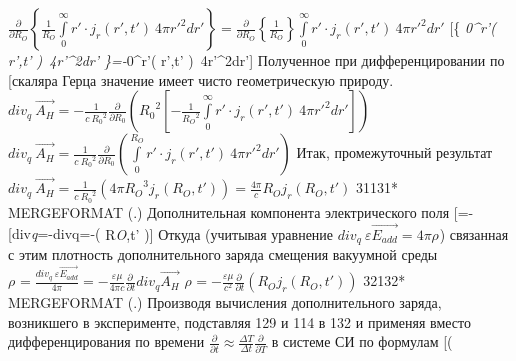 \documentclass[11pt]{article}
\begin{document}
\(\frac{\partial }{\partial {{R}_{O}}}\left\{ \frac{1}{{{R}_{O}}}\int\limits_{0}^{\infty }{r'\cdot {{j}_{r}}\left( r',t' \right)}\ 4\pi r{{'}^{2}}dr' \right\}=\frac{\partial }{\partial {{R}_{O}}}\left\{ \frac{1}{{{R}_{O}}} \right\}\int\limits_{0}^{\infty }{r'\cdot {{j}_{r}}\left( r',t' \right)}\ 4\pi r{{'}^{2}}dr'\)
{[}\left\{
\int\limits\emph{{0}^{\infty }{r'\left(
r',t' \right)}~4\pi r{{'}^{2}}dr'
\right\}=-\int\limits}{0}^{\infty }{r'\left(
r',t' \right)}~4\pi r{{'}^{2}}dr'{]} Полученное при
дифференцировании по {[}\frac{\partial }{\partial {{R}_{O}}}{]}скаляра
Герца значение имеет чисто геометрическую природу.
\(di{{v}_{q}}\ \overrightarrow{{{A}_{H}}}=-\frac{1}{c\ {{R}_{0}}^{2}}\frac{\partial }{\partial {{R}_{0}}}\left( {{R}_{0}}^{2}\left[ -\frac{1}{{{R}_{O}}^{2}}\int\limits_{0}^{\infty }{r'\cdot {{j}_{r}}\left( r',t' \right)}\ 4\pi r{{'}^{2}}dr' \right] \right)\)
\(di{{v}_{q}}\ \overrightarrow{{{A}_{H}}}=\frac{1}{c\ {{R}_{0}}^{2}}\frac{\partial }{\partial {{R}_{0}}}\left( \int\limits_{0}^{{{R}_{O}}}{r'\cdot {{j}_{r}}\left( r',t' \right)}\ 4\pi r{{'}^{2}}dr' \right)\)
Итак, промежуточный результат
\(di{{v}_{q}}\ \overrightarrow{{{A}_{H}}}=\frac{1}{c\ {{R}_{0}}^{2}}\left( 4\pi {{R}_{O}}^{3}{{j}_{r}}\left( {{R}_{O}},t' \right) \right)=\frac{4\pi }{c}{{R}_{O}}{{j}_{r}}\left( {{R}_{O}},t' \right)\)
31131* MERGEFORMAT (.) Дополнительная компонента электрического поля
{[}=-\frac{\partial \overrightarrow{{{A}_{H}}}}{\partial t}{]}
{[}di{{v}\emph{{q}}=-di{{v}}{q}}=-\left(
{{R}\emph{{O}},t' \right){]} Откуда (учитывая уравнение
\(di{{v}_{q}}\ \varepsilon \overrightarrow{{{E}_{add}}}=4\pi {{\rho }_{}}\))
связанная с этим плотность дополнительного заряда смещения вакуумной
среды
\({{\rho }_{}}=\frac{di{{v}_{q}}\ \varepsilon \overrightarrow{{{E}_{add}}}}{4\pi }=-\frac{\varepsilon \mu }{4\pi c}\frac{\partial \ }{\partial t}di{{v}_{q}}\overrightarrow{{{A}_{H}}}\)
\({{\rho }_{}}=-\frac{\varepsilon \mu }{{{c}^{2}}}\frac{\partial \ }{\partial t}\left( {{R}_{O}}{{j}_{r}}\left( {{R}_{O}},t' \right) \right)\)
32132* MERGEFORMAT (.) Производя вычисления дополнительного заряда,
возникшего в эксперименте, подставляя 129 и 114 в 132 и применяя вместо
дифференцирования по времени
\(\frac{\partial }{\partial t}\approx \frac{\Delta T}{\Delta t}\frac{\partial }{\partial T}\)
в системе СИ по формулам {[}{{\rho }}{}}\left(
\end{document}
